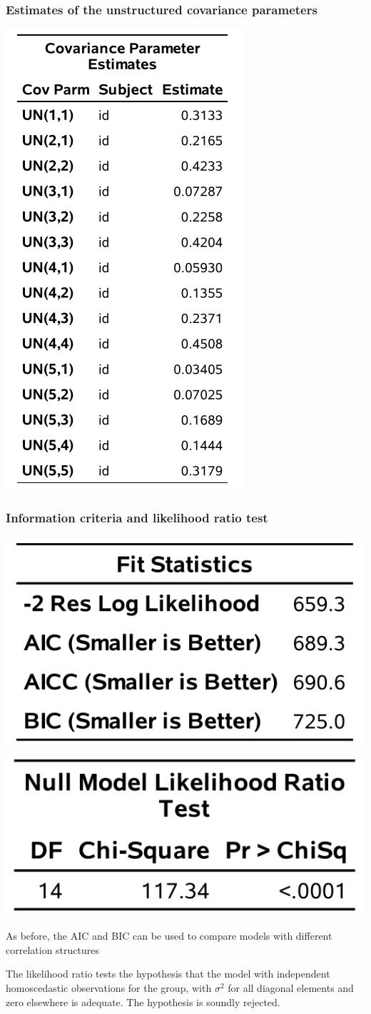 \documentclass{beamer}
\begin{document}
\begin{frame}
\frametitle{Estimates of the unstructured covariance parameters }
\begin{center}
\includegraphics[width = 0.35\linewidth]{img/c5/slides6-e22}
\end{center}

\end{frame}
\begin{frame}
\frametitle{Information criteria and likelihood ratio test}
\begin{center}
\includegraphics[width = 0.4\linewidth]{img/c5/slides6-e23}
\includegraphics[width = 0.4\linewidth]{img/c5/slides6-e24}

\end{center}
\bi
\item As before, the AIC and BIC can be used to compare models with different correlation structures
\item The likelihood ratio tests the hypothesis that the model with independent homoscedastic observations for the group, with $\sigma^2$ for all diagonal elements and zero elsewhere is adequate. The hypothesis is soundly rejected.
\ei
\end{frame}
\end{document}

